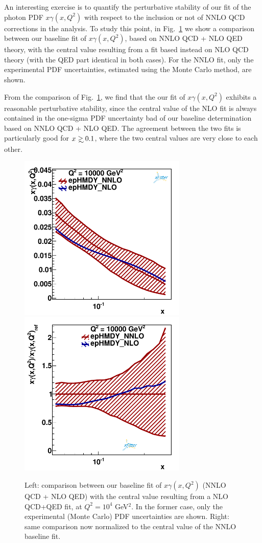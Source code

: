 An interesting exercise
is to quantify the perturbative stability
of our fit of the photon PDF $x\gamma(x,Q^2)$ with respect
to the inclusion or not of NNLO QCD corrections in the analysis.
%
To study this point, in Fig.~\ref{fig:nlo_vs_nnlo} we show
a comparison between our baseline
fit of $x\gamma(x,Q^2)$, based on NNLO QCD + NLO QED theory,
with the central value resulting from a fit based instead on
NLO QCD theory (with the QED part identical in both cases).
%
For the NNLO fit, only the experimental PDF
  uncertainties, estimated using the Monte Carlo method, are shown.

  From the comparison of Fig.~\ref{fig:nlo_vs_nnlo}, we find that
  the our fit of $x\gamma(x,Q^2)$ exhibits a reasonable
  perturbative stability, since the central value of the
  NLO fit is always contained in the one-sigma PDF
  uncertainty bad of our baseline determination based
  on NNLO QCD + NLO QED.
  The agreement between the two fits is particularly good
  for $x\gsim 0.1$, where the two central values are
  very close to each other.

\begin{figure}[t]
\centering
\includegraphics[width=8cm]{figs/q2_10000_pdf_ph_NLOvsNNLO.pdf}
\includegraphics[width=8cm]{figs/q2_10000_pdf_ph_ratio_NLOvsNNLO.pdf}
\caption{Left: comparison between our baseline
  fit of $x\gamma(x,Q^2)$ (NNLO QCD + NLO QED) with the central value
  resulting from a NLO QCD+QED fit, at $Q^2=10^4$ GeV$^2$.
  In the former case, only the experimental (Monte Carlo) PDF
  uncertainties are shown.
  Right: same comparison now normalized to the central value
  of the NNLO baseline fit.
}
\label{fig:nlo_vs_nnlo}
\end{figure}
